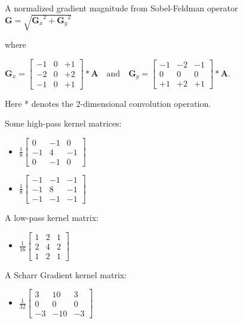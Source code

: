 \documentclass[12pt]{amsart}
\theoremstyle{definition}
\theoremstyle{remark}
\numberwithin{thm}{section}
\begin{document}
A normalized gradient magnitude from Sobel-Feldman operator \cite{Wikipedia/Sobel}
$\mathbf{G} = \sqrt{ {\mathbf{G}_x}^2 + {\mathbf{G}_y}^2 }$

where

$\mathbf{G}_x = \begin{bmatrix} 
 -1 & 0 & +1  \\
-2 & 0 & +2 \\
-1 & 0 & +1 
\end{bmatrix} * \mathbf{A}
\quad
\mbox{and}
\quad   
\mathbf{G}_y = \begin{bmatrix} 
-1 & -2 & -1 \\
 0 & 0 & 0 \\
+1 & +2 & +1
\end{bmatrix} * \mathbf{A}$.

Here * denotes the 2-dimensional convolution operation.

Some high-pass kernel matrices:
\begin{itemize}
\item
$
\frac{1}{8}
\begin{bmatrix}
0 & -1 & 0\\
-1 & 4 & -1\\
0 & -1 & 0
\end{bmatrix}$
\item
$
\frac{1}{8}
\begin{bmatrix}
-1 & -1 & -1\\
-1 & 8 & -1\\
-1 & -1 & -1
\end{bmatrix}$
\end{itemize}

A low-pass kernel matrix:
\begin{itemize}
\item
$
\frac{1}{16}
\begin{bmatrix}
1 & 2 & 1\\
2 & 4 & 2\\
1 & 2 & 1
\end{bmatrix}$
\end{itemize}

A Scharr Gradient kernel matrix:
\begin{itemize}
\item
$
\frac{1}{32}
\begin{bmatrix}
3 & 10 & 3\\
0 & 0 & 0\\
-3 & -10 & -3
\end{bmatrix}$
\end{itemize}
\end{document}
